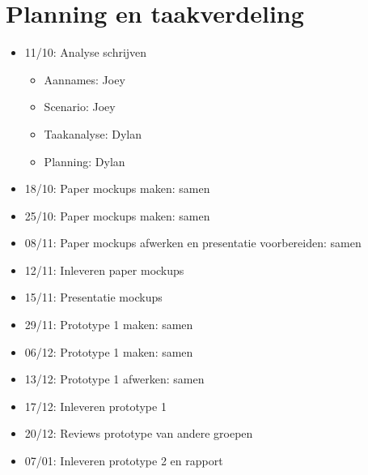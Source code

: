 \documentclass[12pt]{article}
\begin{document}
\section {Planning en taakverdeling}
\begin{itemize}
	\item 11/10: Analyse schrijven
	\begin{itemize}
		\item Aannames: Joey
		\item Scenario: Joey
		\item Taakanalyse: Dylan
		\item Planning: Dylan
	\end{itemize}
	\item 18/10: Paper mockups maken: samen
	\item 25/10: Paper mockups maken: samen
	\item 08/11: Paper mockups afwerken en presentatie voorbereiden: samen
	\item 12/11: Inleveren paper mockups
	\item 15/11: Presentatie mockups
	\item 29/11: Prototype 1 maken: samen
	\item 06/12: Prototype 1 maken: samen
	\item 13/12: Prototype 1 afwerken: samen
	\item 17/12: Inleveren prototype 1
	\item 20/12: Reviews prototype van andere groepen
	\item 07/01: Inleveren prototype 2 en rapport
\end{itemize}
\end{document}
